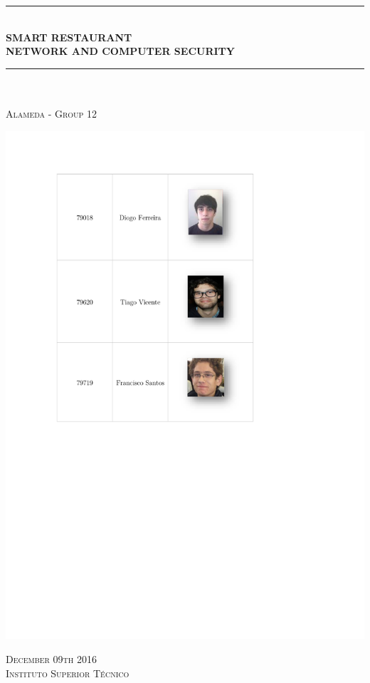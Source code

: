 \documentclass[12pt,paper=a4]{article}
\begin{document}
\begin{titlepage}
	
	\begin{center}
	
		\noindent\rule{16cm}{0.4pt}\\
		\huge{\bfseries SMART RESTAURANT}\\
		\Large{\bfseries NETWORK AND COMPUTER SECURITY}\\
		\noindent\rule{13cm}{0.4pt}\\
		
		
		\hfill\\
		\textsc{\large Alameda - Group 12}\\
	
		\hfill
	
		\includegraphics[scale=0.8,trim=-1.1cm 19cm 0 2cm]{Fotos.pdf}
		
		
		\vfill
		\textsc{\small December 09th 2016}\\
		\textsc{\large Instituto Superior Técnico}\\

	\end{center}
	
\end{titlepage}
\end{document}
